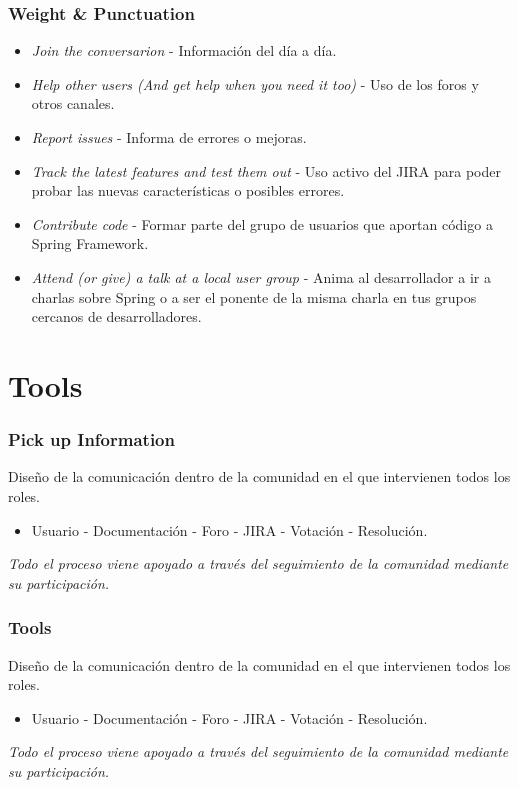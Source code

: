 \documentclass[xcolor=dvipsnames]{beamer}
\begin{document}
\begin{frame}[allowframebreaks]
\frametitle{Weight \& Punctuation}
\begin{itemize}
    \item \emph{Join the conversarion} - Informaci\'on del d\'ia a d\'ia.
    \item \emph{Help other users (And get help when you need it too)} - Uso de los foros y otros canales.
    \item \emph{Report issues} - Informa de errores o mejoras.
    \item \emph{Track the latest features and test them out} - Uso activo del JIRA para poder probar las nuevas caracter\'isticas o posibles errores.
    \item \emph{Contribute code} - Formar parte del grupo de usuarios que aportan c\'odigo a Spring Framework.
    \item \emph{Attend (or give) a talk at a local user group} - Anima al desarrollador a ir a charlas sobre Spring o a ser el ponente de la misma charla en tus grupos cercanos de desarrolladores.
\end{itemize}
\end{frame}

\section{Tools}
\begin{frame}[allowframebreaks]
\frametitle{Pick up Information}
Dise\~no de la comunicaci\'on dentro de la comunidad en el que intervienen todos los roles.
\begin{itemize}
    \item Usuario - Documentaci\'on - Foro - JIRA - Votaci\'on - Resoluci\'on.
\end{itemize}
\emph{Todo el proceso viene apoyado a trav\'es del seguimiento de la comunidad mediante su participaci\'on.}
\end{frame}

\begin{frame}[allowframebreaks]
\frametitle{Tools}
Dise\~no de la comunicaci\'on dentro de la comunidad en el que intervienen todos los roles.
\begin{itemize}
    \item Usuario - Documentaci\'on - Foro - JIRA - Votaci\'on - Resoluci\'on.
\end{itemize}
\emph{Todo el proceso viene apoyado a trav\'es del seguimiento de la comunidad mediante su participaci\'on.}
\end{frame}
\end{document}
